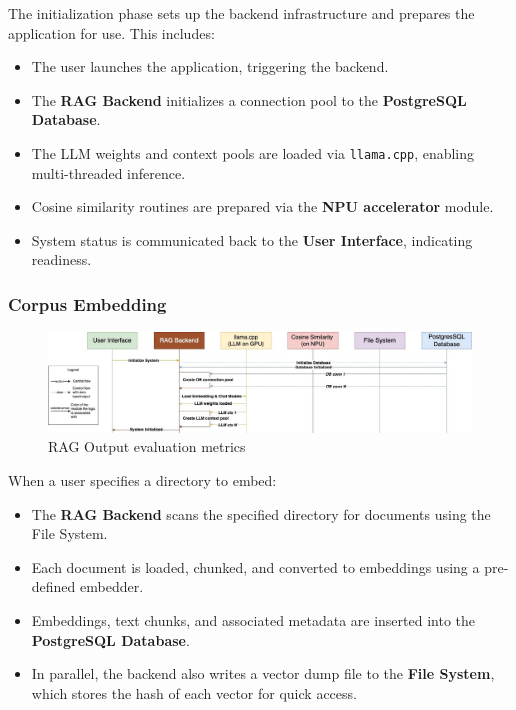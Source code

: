 {The initialization phase sets up the backend infrastructure and prepares the application for use. This includes:

\begin{itemize}
    \item The user launches the application, triggering the backend.
    \item The \textbf{RAG Backend} initializes a connection pool to the \textbf{PostgreSQL Database}.
    \item The LLM weights and context pools are loaded via \texttt{llama.cpp}, enabling multi-threaded inference.
    \item Cosine similarity routines are prepared via the \textbf{NPU accelerator} module.
    \item System status is communicated back to the \textbf{User Interface}, indicating readiness.
\end{itemize}

\subsubsection{Corpus Embedding}

\begin{figure}[H]
    \centering
    \includegraphics[width=1.0\linewidth]{images/tldr-app-worklfow-pt1.jpg}
    \caption{RAG Output evaluation metrics ~\cite{cardenas2023rag}}
    \label{fig:autoregressive_decoding}
\end{figure}

When a user specifies a directory to embed:

\begin{itemize}
    \item The \textbf{RAG Backend} scans the specified directory for documents using the File System.
    \item Each document is loaded, chunked, and converted to embeddings using a pre-defined embedder.
    \item Embeddings, text chunks, and associated metadata are inserted into the \textbf{PostgreSQL Database}.
    \item In parallel, the backend also writes a vector dump file to the \textbf{File System}, which stores the hash of each vector for quick access.
\end{itemize}

}
